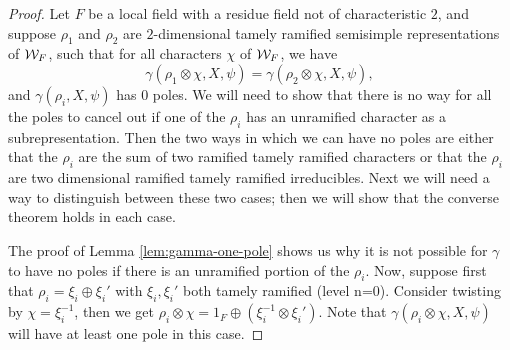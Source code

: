 \begin{proof}
  Let $F$ be a local field with a residue field not of characteristic $2$, and suppose $\rho_1$ and $\rho_2$ are $2$-dimensional tamely ramified semisimple representations of $\mathcal{W}_F$, such that for all characters $\chi$ of $\mathcal{W}_F$, we have
  \[\gamma(\rho_1 \otimes \chi,X,\psi) = \gamma(\rho_2 \otimes \chi,X,\psi),\]
  and $\gamma(\rho_i,X,\psi)$ has $0$ poles.
  We will need to show that there is no way for all the poles to cancel out if one of the $\rho_i$ has an unramified character as a subrepresentation.
  Then the two ways in which we can have no poles are either that the $\rho_i$ are the sum of two ramified tamely ramified characters or that the $\rho_i$ are two dimensional ramified tamely ramified irreducibles.
  Next we will need a way to distinguish between these two cases; then we will show that the converse theorem holds in each case.

  The proof of Lemma \ref{lem:gamma-one-pole} shows us why it is not possible for $\gamma$ to have no poles if there is an unramified portion of the $\rho_i$.
  Now, suppose first that $\rho_i = \xi_i \oplus \xi_i'$ with $\xi_i, \xi_i'$ both tamely ramified (level n=0).
  Consider twisting by $\chi = \xi_i^{-1}$, then we get $\rho_i \otimes \chi = 1_F \oplus (\xi_i^{-1} \otimes \xi_i')$.
  Note that $\gamma(\rho_i \otimes \chi,X,\psi)$ will have at least one pole in this case.


\end{proof}
